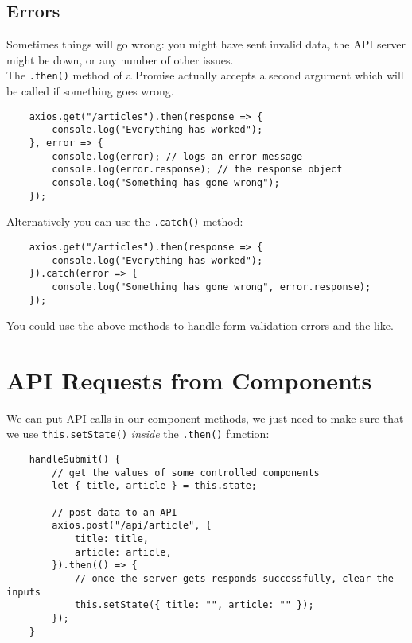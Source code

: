 \subsection{Errors}

Sometimes things will go wrong: you might have sent invalid data, the API server might be down, or any number of other issues.
\\

The \texttt{.then()} method of a Promise actually accepts a second argument which will be called if something goes wrong.

\begin{verbatim}
    axios.get("/articles").then(response => {
        console.log("Everything has worked");
    }, error => {
        console.log(error); // logs an error message
        console.log(error.response); // the response object
        console.log("Something has gone wrong");
    });
\end{verbatim}

Alternatively you can use the \texttt{.catch()} method:

\begin{verbatim}
    axios.get("/articles").then(response => {
        console.log("Everything has worked");
    }).catch(error => {
        console.log("Something has gone wrong", error.response);
    });
\end{verbatim}

You could use the above methods to handle form validation errors and the like.

\section{API Requests from Components}

We can put API calls in our component methods, we just need to make sure that we use \texttt{this.setState()} \textit{inside} the \texttt{.then()} function:

\begin{verbatim}
    handleSubmit() {
        // get the values of some controlled components
        let { title, article } = this.state;

        // post data to an API
        axios.post("/api/article", {
            title: title,
            article: article,
        }).then(() => {
            // once the server gets responds successfully, clear the inputs
            this.setState({ title: "", article: "" });
        });
    }
\end{verbatim}

